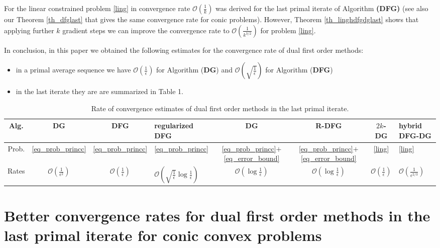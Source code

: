 \documentclass{gOMS2e}
\theoremstyle{plain}
\theoremstyle{definition}
\theoremstyle{remark}
\begin{document}
\noindent For the linear constrained problem \eqref{ling} in
\cite{BecTeb:14} convergence rate $\mathcal{O}(\frac{1}{k})$ was
derived for the last primal iterate of Algorithm  \textbf{(DFG)}
(see also our Theorem \ref{th_dfglast} that  gives the same
convergence rate for conic problems). However, Theorem
\ref{th_linghdfgdglast} shows that applying further $k$ gradient
steps we can improve the convergence rate to
$\mathcal{O}(\frac{1}{k^{3/2}})$ for problem \eqref{ling}.

\vspace{0.2cm}

\noindent  In conclusion, in this paper we obtained the following
estimates for the convergence rate of dual first order methods:
\begin{itemize}
\item in a primal average sequence we have
$\mathcal{O}(\frac{1}{\epsilon})$ for Algorithm (\textbf{DG}) and
$\mathcal{O}(\sqrt{\frac{1}{\epsilon}})$ for Algorithm
(\textbf{DFG})
\item  in the last iterate they are are summarized in Table 1.
\end{itemize}

\begin{table}[ht]
\centering \caption{Rate of convergence estimates of dual first
order methods in the last primal iterate.}

\begin{tabular} {| c || c | c | p{2cm} | c | c | c | p{2cm} |}
\hline
Alg.  &  DG     &  DFG  &  regularized  DFG   &  DG  &  R-DFG  &  $2k$-DG & hybrid  DFG-DG  \\
[1ex]\hline Prob.   & \eqref{eq_prob_princc} &
\eqref{eq_prob_princc} & \eqref{eq_prob_princc} &
\eqref{eq_prob_princc}$+$\eqref{eq_error_bound} &
  \eqref{eq_prob_princc}$+$\eqref{eq_error_bound} & \eqref{ling}  & \eqref{ling}  \\
[1ex]\hline Rates & $\mathcal{O}(\frac{1}{\epsilon^2})$ &
$\mathcal{O}(\frac{1}{\epsilon})$ &
$\mathcal{O}(\sqrt{\frac{1}{\epsilon}} \log \frac{1}{\epsilon})$  &
$\mathcal{O}(\log \frac{1}{\epsilon})$ & $\mathcal{O}(\log
\frac{1}{\epsilon})$ & $\mathcal{O}(\frac{1}{\epsilon})$ &
$\mathcal{O}(\frac{1}{\epsilon^{2/3}})$   \\
[1ex] \hline
\end{tabular}
\end{table}

\section{Better convergence rates  for dual first order methods
in the last primal iterate for conic convex problems}
\end{document}
